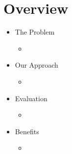 \section*{Overview}

\begin{frame}
\begin{itemize}
  \item The Problem
  \begin{itemize}
    \item %
  \end{itemize}

  \item Our Approach
  \begin{itemize}
    \item %
  \end{itemize}

  \item Evaluation
  \begin{itemize}
    \item %
  \end{itemize}

  \item Benefits
  \begin{itemize}
    \item %
  \end{itemize}
\end{itemize}
\end{frame}
